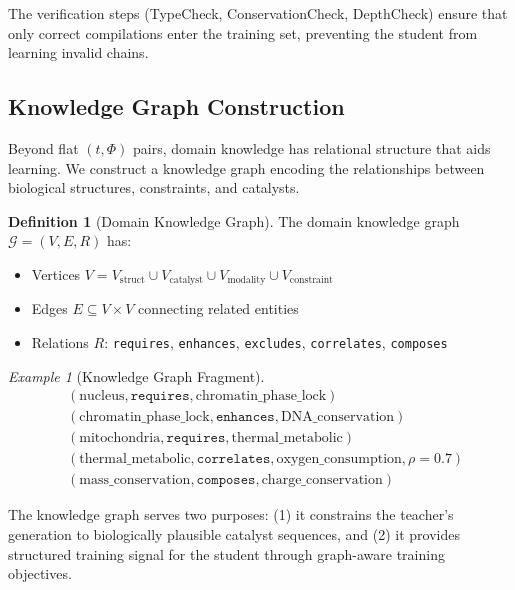 \documentclass[11pt,a4paper]{article}
\theoremstyle{definition}
\newtheorem{definition}[theorem]{Definition}
\theoremstyle{remark}
\newtheorem{example}[theorem]{Example}
\newcommand{\morphism}{\Phi}
\begin{document}
The verification steps (TypeCheck, ConservationCheck, DepthCheck) ensure that only correct compilations enter the training set, preventing the student from learning invalid chains.

\subsection{Knowledge Graph Construction}

Beyond flat $(t, \morphism)$ pairs, domain knowledge has relational structure that aids learning. We construct a knowledge graph encoding the relationships between biological structures, constraints, and catalysts.

\begin{definition}[Domain Knowledge Graph]
\label{def:kg}
The domain knowledge graph $\mathcal{G} = (V, E, R)$ has:
\begin{itemize}
    \item Vertices $V = V_{\text{struct}} \cup V_{\text{catalyst}} \cup V_{\text{modality}} \cup V_{\text{constraint}}$
    \item Edges $E \subseteq V \times V$ connecting related entities
    \item Relations $R$: \texttt{requires}, \texttt{enhances}, \texttt{excludes}, \texttt{correlates}, \texttt{composes}
\end{itemize}
\end{definition}

\begin{example}[Knowledge Graph Fragment]
\begin{align}
&(\text{nucleus}, \texttt{requires}, \text{chromatin\_phase\_lock}) \\
&(\text{chromatin\_phase\_lock}, \texttt{enhances}, \text{DNA\_conservation}) \\
&(\text{mitochondria}, \texttt{requires}, \text{thermal\_metabolic}) \\
&(\text{thermal\_metabolic}, \texttt{correlates}, \text{oxygen\_consumption}, \rho = 0.7) \\
&(\text{mass\_conservation}, \texttt{composes}, \text{charge\_conservation})
\end{align}
\end{example}

The knowledge graph serves two purposes: (1) it constrains the teacher's generation to biologically plausible catalyst sequences, and (2) it provides structured training signal for the student through graph-aware training objectives.
\end{document}
